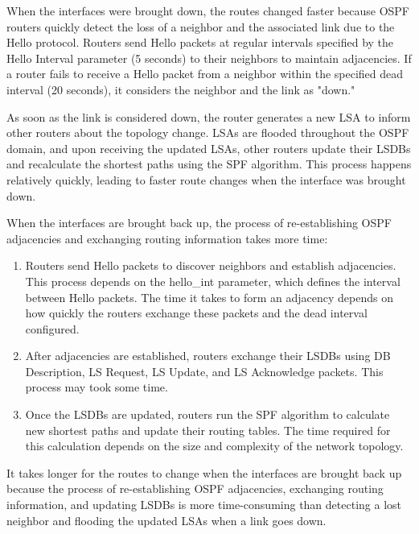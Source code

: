 When the interfaces were brought down, the routes changed faster because OSPF routers quickly detect the loss of a neighbor and the associated link due to the Hello protocol. Routers send Hello packets at regular intervals specified by the Hello Interval parameter (5 seconds) to their neighbors to maintain adjacencies. If a router fails to receive a Hello packet from a neighbor within the specified dead interval (20 seconds), it considers the neighbor and the link as "down."

As soon as the link is considered down, the router generates a new LSA to inform other routers about the topology change. LSAs are flooded throughout the OSPF domain, and upon receiving the updated LSAs, other routers update their LSDBs and recalculate the shortest paths using the SPF algorithm. This process happens relatively quickly, leading to faster route changes when the interface was brought down.

When the interfaces are brought back up, the process of re-establishing OSPF adjacencies and exchanging routing information takes more time:

\begin{enumerate}
  \item Routers send Hello packets to discover neighbors and establish adjacencies. This process depends on the hello\_int parameter, which defines the interval between Hello packets. The time it takes to form an adjacency depends on how quickly the routers exchange these packets and the dead interval configured.
  \item After adjacencies are established, routers exchange their LSDBs using DB Description, LS Request, LS Update, and LS Acknowledge packets. This process may took some time.
  \item Once the LSDBs are updated, routers run the SPF algorithm to calculate new shortest paths and update their routing tables. The time required for this calculation depends on the size and complexity of the network topology.
\end{enumerate}

It takes longer for the routes to change when the interfaces are brought back up because the process of re-establishing OSPF adjacencies, exchanging routing information, and updating LSDBs is more time-consuming than detecting a lost neighbor and flooding the updated LSAs when a link goes down.

